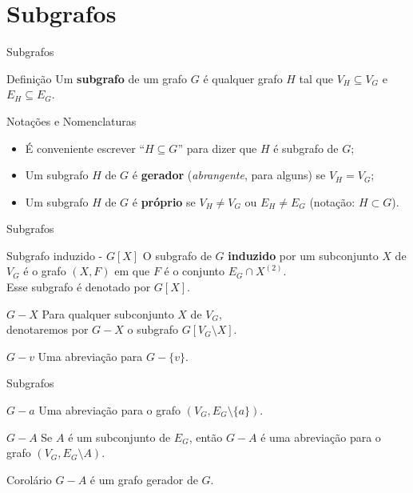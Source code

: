 \documentclass[xcolor=dvipsnames,table]{beamer}
\begin{document}
	\section{Subgrafos}
	\begin{frame}{Subgrafos}
		\begin{block}{Definição}
			Um {\bf subgrafo} de um grafo $G$ é qualquer grafo $H$ tal que $V_H \subseteq V_G$ e $E_H \subseteq E_G$.
		\end{block} \pause
		\begin{block}{Notações e Nomenclaturas}
			\begin{itemize}
				\item É conveniente escrever ``$H \subseteq G$'' para dizer que $H$ é subgrafo de $G$; \pause
				\item Um subgrafo $H$ de $G$ é {\bf gerador} ({\it abrangente}, para alguns) se $V_H = V_G$; \pause
				\item Um subgrafo $H$ de $G$ é {\bf próprio} se $V_H \not= V_G$ ou $E_H \not= E_G$ (notação: $H \subset G$).
			\end{itemize}
		\end{block}
	\end{frame}
	
	\begin{frame}{Subgrafos}
		\begin{block}{Subgrafo induzido - $G[X]$}
			O subgrafo de $G$ {\bf induzido} por um subconjunto $X$ de $V_G$ é o grafo $(X, F)$ em que $F$ é o conjunto $E_G \cap X^{(2)}$. \\Esse subgrafo é denotado por $G[X]$.
		\end{block} \pause
		\begin{block}{$G - X$}
			Para qualquer subconjunto $X$ de $V_G$, \\denotaremos por $G - X$ o subgrafo $G[V_G \setminus X]$.
		\end{block} \pause
		\begin{block}{$G - v$}
			Uma abreviação para $G - \{ v \}$.
		\end{block}
	\end{frame}
	
	\begin{frame}{Subgrafos}
		\begin{block}{$G - a$}
			Uma abreviação para o grafo $(V_G, E_G \setminus \{ a \})$.
		\end{block} \pause
		\begin{block}{$G - A$}
			Se $A$ é um subconjunto de $E_G$, então $G - A$ é uma abreviação para o grafo $(V_G, E_G \setminus A)$.
		\end{block} \pause
		\begin{block}{Corolário}
			$G - A$ é um grafo gerador de $G$.
		\end{block}
	\end{frame}
    
\end{document}
